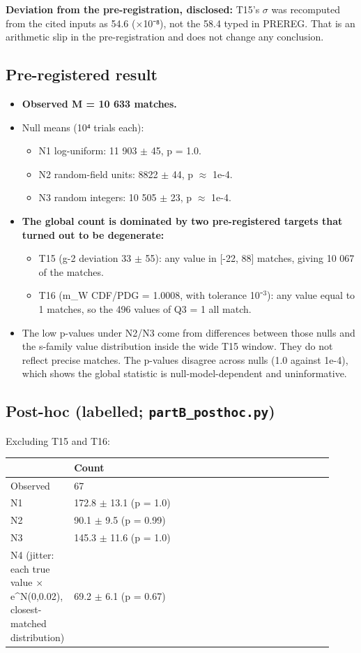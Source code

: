 \documentclass[10pt]{article}\usepackage[margin=0.8in]{geometry}\usepackage{amssymb,longtable,array,url,hyperref}\usepackage[T1]{fontenc}\usepackage{lmodern}\sloppy\usepackage{newunicodechar}\newunicodechar{η}{\ensuremath{\eta}}\newunicodechar{ω}{\ensuremath{\omega}}\newunicodechar{⁺}{\ensuremath{^{+}}}\newunicodechar{⁻}{\ensuremath{^{-}}}\newunicodechar{∏}{\ensuremath{\prod}}\newunicodechar{⁸}{\ensuremath{^{8}}}\newunicodechar{⁴}{\ensuremath{^{4}}}\newunicodechar{⁶}{\ensuremath{^{6}}}\newunicodechar{θ}{\ensuremath{\theta}}\newunicodechar{₇}{\ensuremath{_{7}}}\newunicodechar{₂}{\ensuremath{_{2}}}\newunicodechar{₁}{\ensuremath{_{1}}}\newunicodechar{⊕}{\ensuremath{\oplus}}
\begin{document}
\textbf{Deviation from the pre-registration, disclosed:} T15's $\sigma$ was recomputed from the cited inputs as 54.6 ($\times$10⁻⁸), not the 58.4 typed in PREREG. That is an arithmetic slip in the pre-registration and does not change any conclusion.

\subsection*{Pre-registered result}

\begin{itemize}
\item  \textbf{Observed M = 10 633 matches.}
\item  Null means (10⁴ trials each):
\begin{itemize}
\item  N1 log-uniform: 11 903 $\pm$ 45, p = 1.0.
\item  N2 random-field units: 8822 $\pm$ 44, p $\approx$ 1e-4.
\item  N3 random integers: 10 505 $\pm$ 23, p $\approx$ 1e-4.
\end{itemize}
\item  \textbf{The global count is dominated by two pre-registered targets that turned out to be degenerate:}
\begin{itemize}
\item  T15 (g-2 deviation 33 $\pm$ 55): any value in [-22, 88] matches, giving 10 067 of the matches.
\item  T16 (m\_W CDF/PDG = 1.0008, with tolerance 10⁻$^3$): any value equal to 1 matches, so the 496 values of Q3 = 1 all match.
\end{itemize}
\item  The low p-values under N2/N3 come from differences between those nulls and the s-family value distribution inside the wide T15 window. They do not reflect precise matches. The p-values disagree across nulls (1.0 against 1e-4), which shows the global statistic is null-model-dependent and uninformative.
\end{itemize}

\subsection*{Post-hoc (labelled; \texttt{partB\_posthoc.py})}

Excluding T15 and T16:

{\small\begin{longtable}{p{0.04\linewidth}p{0.36\linewidth}p{0.44\linewidth}p{0.08\linewidth}}\hline
\textbf{} & \textbf{Count}\\\hline\endhead
Observed & 67\\\hline
N1 & 172.8 $\pm$ 13.1 (p = 1.0)\\\hline
N2 & 90.1 $\pm$ 9.5 (p = 0.99)\\\hline
N3 & 145.3 $\pm$ 11.6 (p = 1.0)\\\hline
N4 (jitter: each true value $\times$ e\^{}{N(0,0.02)}, closest-matched distribution) & 69.2 $\pm$ 6.1 (p = 0.67)\\\hline
\end{longtable}}
\end{document}
